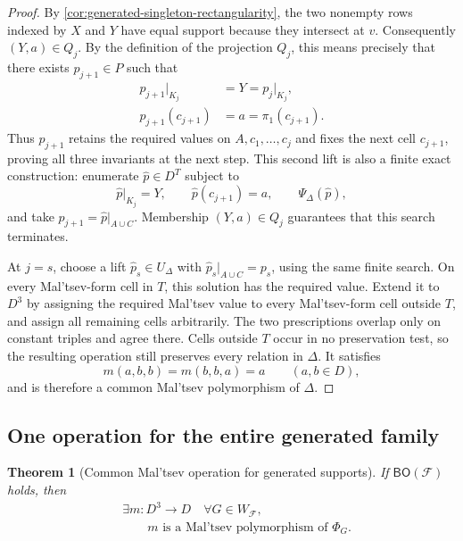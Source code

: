 \documentclass[11pt]{article}
\theoremstyle{plain}
\newtheorem{theorem}{Theorem}[section]
\theoremstyle{definition}
\theoremstyle{remark}
\newcommand{\cF}{\mathcal F}
\newcommand{\BO}{\mathsf{BO}}
\newcommand{\SuppRel}[1]{\Phi_{#1}}
\begin{document}
\begin{proof}
By \cref{cor:generated-singleton-rectangularity}, the two nonempty rows
indexed by $X$ and $Y$ have equal support because they intersect at $v$.
Consequently $(Y,a)\in Q_j$.  By the definition of the projection $Q_j$,
this means precisely that there exists $p_{j+1}\in P$ such that
\begin{equation*}
\begin{aligned}
  p_{j+1}|_{K_j}&=Y=p_j|_{K_j},\\
  p_{j+1}(c_{j+1})&=a=\pi_1(c_{j+1}).
\end{aligned}
\end{equation*}
Thus $p_{j+1}$ retains the required values on $A,c_1,\ldots,c_j$ and fixes
the next cell $c_{j+1}$, proving all three invariants at the next step.
This second lift is also a finite exact construction: enumerate
$\widehat p\in D^T$ subject to
\[
  \widehat p|_{K_j}=Y,
  \qquad
  \widehat p(c_{j+1})=a,
  \qquad
  \Psi_\Delta(\widehat p),
\]
and take $p_{j+1}=\widehat p|_{A\cup C}$.  Membership
$(Y,a)\in Q_j$ guarantees that this search terminates.

At $j=s$, choose a lift $\widehat p_s\in U_\Delta$ with
$\widehat p_s|_{A\cup C}=p_s$, using the same finite search.  On every
Mal'tsev-form cell in $T$, this solution has the required value.  Extend it
to $D^3$ by
assigning the required Mal'tsev value to every Mal'tsev-form cell outside
$T$, and assign all remaining cells arbitrarily.  The two prescriptions
overlap only on constant triples and agree there.  Cells outside $T$ occur
in no preservation test, so the resulting operation still preserves every
relation in $\Delta$.  It satisfies
\[
  m(a,b,b)=m(b,b,a)=a
  \qquad(a,b\in D),
\]
and is therefore a common Mal'tsev polymorphism of $\Delta$.
\end{proof}

\subsection{One operation for the entire generated family}

\begin{theorem}[Common Mal'tsev operation for generated supports]
\label{thm:common-support-maltsev}
If $\BO(\cF)$ holds, then
\begin{equation}
  \begin{aligned}
  &\exists m:D^3\to D\quad\forall G\in W_{\cF},\\
  &\qquad
    m\text{ is a Mal'tsev polymorphism of }\SuppRel G.
  \end{aligned}
  \label{eq:global-support-maltsev}
\end{equation}
\end{theorem}
\end{document}
